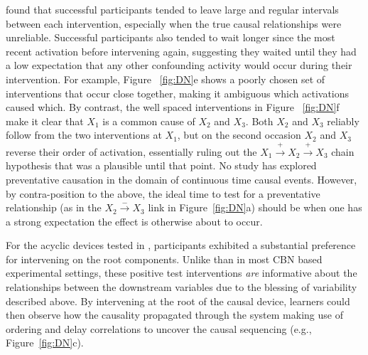 \documentclass{cambridge7A}%
\begin{document}
\cite{bramley2017dynamic} found that successful participants tended to leave large and regular intervals between each intervention, especially when the true causal relationships were unreliable.  Successful participants also tended to wait longer since the most recent activation before intervening again, suggesting they waited until they had a low expectation that any other confounding activity would occur during their intervention.  For example, Figure ~\ref{fig:DN}e shows a poorly chosen set of interventions that occur close together, making it ambiguous which activations caused which.  By contrast, the well spaced interventions in Figure ~\ref{fig:DN}f make it clear that $X_1$ is a common cause of $X_2$ and $X_3$.  Both $X_2$ and $X_3$ reliably follow from the two interventions at $X_1$, but on the second occasion $X_2$ and $X_3$ reverse their order of activation, essentially ruling out the $X_1\!\stackrel{+}\rightarrow\!X_2\!\stackrel{+}\rightarrow\!X_3$ chain hypothesis that was a plausible until that point.  No study has explored preventative causation in the domain of continuous time causal events. However, by contra-position to the above, the ideal time to test for a preventative relationship (as in the $X_2\!\stackrel{-}\rightarrow\!X_3$ link in Figure~\ref{fig:DN}a) should be when one has a strong expectation the effect is otherwise about to occur.


For the acyclic devices tested in \cite{bramley2017dynamic}, participants exhibited a substantial preference for intervening on the root components.  Unlike than in most CBN based experimental settings, these positive test interventions \emph{are} informative about the relationships between the downstream variables due to the blessing of variability described above.   By intervening at the root of the causal device, learners could then observe how the causality propagated through the system making use of ordering and delay correlations to uncover the causal sequencing (e.g., Figure~\ref{fig:DN}c).
\end{document}
